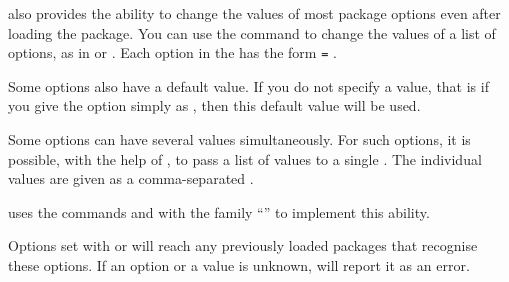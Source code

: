 \begin{Declaration}
\end{Declaration}
\KOMAScript{} also
provides the ability to change the values of most
package options
even after loading the  package. You can use the  command to change the
values of a list of options, as in
 or
. Each option in the
 has the form \texttt{=}%
.

Some options also have a default value. If you do not specify a value, that is
if you give the option simply as , then this default value will
be used.

Some options can have several values simultaneously. For such options, it is
possible, with the help of , to pass a list of values to a
single . The individual values are given as a comma-separated
.

\begin{Explain}
  \KOMAScript{} uses the commands  and
   with the family ``'' to
  implement this ability.
\end{Explain}

Options set with  or  will reach
any
previously loaded \KOMAScript{} packages that recognise these options. If an
option or a value is unknown, \hyperref[cha:scrbase]{}%
will report it as an error.%
%
\iffalse%
\iffree{}{\IfThisCommonLabelBase{scrlayer-scrpage}{\par
  Incidentally, the \Package{scrpage2}\IndexPackage{scrpage2}%
  \important{\Package{scrpage2}}, which is considered obsolete, does not have
  this extension. Options can therefore only be set when the package is loaded
  with the option explained previously.}{}}%
\fi%
%
\EndIndexGroup
%
\EndIndexGroup

\label{sec:\ThisCommonLabelBase.options.end}
\endinput

